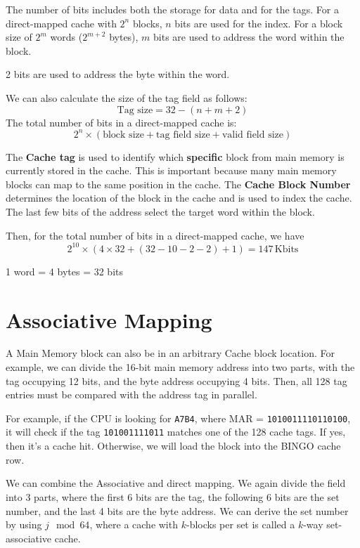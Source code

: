 The number of bits includes both the storage for data and for the tags. For a direct-mapped cache with \(2^n\) blocks, \(n\) bits are used for the index. For a block size of \(2^m\) words (\(2^{m+2}\) bytes), \(m\) bits are used to address the word within the block.

2 bits are used to address the byte within the word.

We can also calculate the size of the tag field as follows:
\[
  \text{Tag size} = 32 - (n + m + 2)
\]
The total number of bits in a direct-mapped cache is:
\[
  2^n \times (\text{block size} + \text{tag field size} + \text{valid field size})
\]

The \textbf{Cache tag} is used to identify which \textbf{specific} block from main memory is currently stored in the cache. This is important because many main memory blocks can map to the same position in the cache. The \textbf{Cache Block Number} determines the location of the block in the cache and is used to index the cache. The last few bits of the address select the target word within the block.

Then, for the total number of bits in a direct-mapped cache, we have
\[
  2^{10} \times (4 \times 32 + (32 - 10 - 2 - 2) + 1) = 147\,\text{Kbits}
\]

\begin{remark}
  1 word = 4 bytes = 32 bits
\end{remark}

\section{Associative Mapping}
A Main Memory block can also be in an arbitrary Cache block location. For example, we can divide the 16-bit main memory address into two parts, with the tag occupying 12 bits, and the byte address occupying 4 bits. Then, all 128 tag entries must be compared with the address tag in parallel.

For example, if the CPU is looking for \verb|A7B4|, where MAR = \verb|1010011110110100|, it will check if the tag \verb|101001111011| matches one of the 128 cache tags. If yes, then it's a cache hit. Otherwise, we will load the block into the BINGO cache row.

We can combine the Associative and direct mapping. We again divide the field into 3 parts, where the first 6 bits are the tag, the following 6 bits are the set number, and the last 4 bits are the byte address. We can derive the set number by using \(j \mod 64\), where a cache with \(k\)-blocks per set is called a \(k\)-way set-associative cache.

